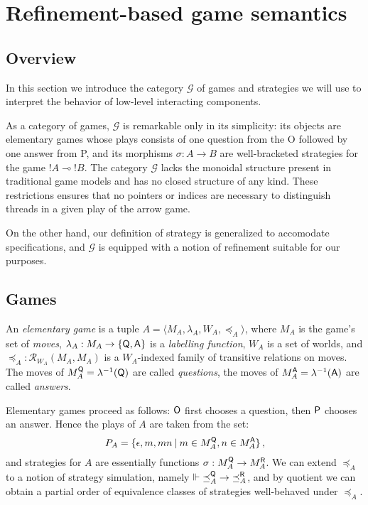 \section{Refinement-based game semantics}

\subsection{Overview}

In this section we introduce the category $\mathcal{G}$ of games and strategies
we will use to interpret the behavior of low-level interacting components.

As a category of games, $\mathcal{G}$ is remarkable only in its simplicity:
its objects are elementary games whose plays consists of
one question from the O followed by one answer from P,
and its morphisms $\sigma : A \rightarrow B$
are well-bracketed strategies for the game ${!A} \multimap {!B}$.
The category
$\mathcal{G}$ lacks the monoidal structure present in traditional game models
and has no closed structure of any kind.
These restrictions ensures that no pointers or indices
are necessary to distinguish threads in a given play of the arrow game.

On the other hand,
our definition of strategy is generalized to accomodate specifications,
and $\mathcal{G}$ is equipped with a notion of refinement
suitable for our purposes.

\subsection{Games}

\begin{definition}
An \emph{elementary game} is a tuple
$A = \langle M_A, \lambda_A, W_A, \preceq_A \rangle$, where
$M_A$ is the game's set of \emph{moves},
$\lambda_A : M_A \rightarrow \{  \mathsf{Q} ,  \mathsf{A}  \}$ is
a \emph{labelling function},
$W_A$ is a set of worlds, and
${\preceq}_A : \mathcal{R}_{W_A}(M_A, M_A)$ is
a $W_A$-indexed family of transitive relations on moves.
The moves of $M_A^{ \mathsf{Q} } = \lambda^{-1}( \mathsf{Q} )$ are called \emph{questions},
the moves of $M_A^{ \mathsf{A} } = \lambda^{-1}( \mathsf{A} )$ are called \emph{answers}.
\end{definition}

Elementary games proceed as follows:
$ \mathsf{O} $ first chooses a question, then $ \mathsf{P} $ chooses an answer.
Hence the plays of $A$ are taken from the set:
\[
    P_A = \{ \epsilon, m, mn \:|\: m \in M_A^{ \mathsf{Q} }, n \in M_A^{ \mathsf{A} } \} \,,
\]
and strategies for $A$ are essentially
functions $\sigma : M_A^{ \mathsf{Q} } \rightarrow M_A^{ \mathsf{R} }$.
We can extend $\preceq_A$ to a notion of strategy simulation,
namely $\Vdash {\preceq}_A^{ \mathsf{Q} } \rightarrow {\preceq}_A^{ \mathsf{R} }$,
and by quotient we can obtain a partial order
of equivalence classes 
of strategies well-behaved under $\preceq_A$.

